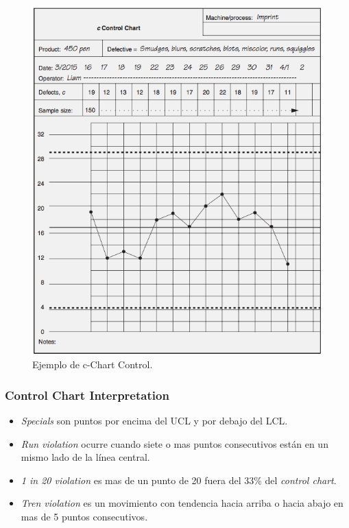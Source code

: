 \documentclass[]{article}
\begin{document}
\begin{figure}[H]
	\centering
	\includegraphics[width=120mm]{imagenes/cChartEjemplo.png}
	\caption{Ejemplo de c-Chart Control.}
	\label{fig:cChartEjemplo}
\end{figure}

\subsubsection{Control Chart Interpretation}

\begin{itemize}
	\item \textit{Specials} son puntos por encima del UCL y por debajo del LCL.
	\item \textit{Run violation} ocurre cuando siete o mas puntos consecutivos están en un mismo lado de la línea central.
	\item \textit{1 in 20 violation} es mas de un punto de 20 fuera del 33\% del \textit{control chart}.
	\item \textit{Tren violation} es un movimiento con tendencia hacia arriba o hacia abajo en mas de 5 puntos consecutivos.
\end{itemize}
\end{document}
